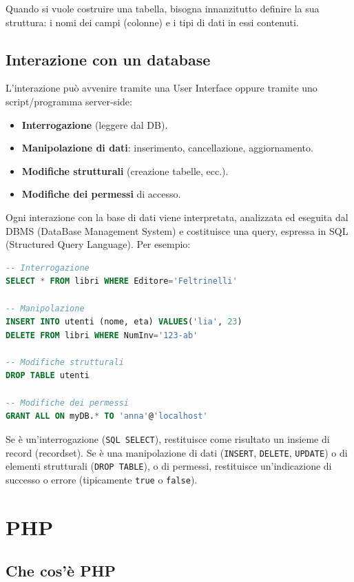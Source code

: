 Quando si vuole costruire una tabella, bisogna innanzitutto definire la sua struttura: i nomi dei campi (colonne) e i tipi di dati in essi contenuti.

\subsection{Interazione con un database}

L'interazione può avvenire tramite una User Interface oppure tramite uno script/programma server-side:

\begin{itemize}
    \item \textbf{Interrogazione} (leggere dal DB).
    \item \textbf{Manipolazione di dati}: inserimento, cancellazione, aggiornamento.
    \item \textbf{Modifiche strutturali} (creazione tabelle, ecc.).
    \item \textbf{Modifiche dei permessi} di accesso.
\end{itemize}

Ogni interazione con la base di dati viene interpretata, analizzata ed eseguita dal DBMS (DataBase Management System) e costituisce una query, espressa in SQL (Structured Query Language). Per esempio:

\begin{lstlisting}[language=SQL]
-- Interrogazione
SELECT * FROM libri WHERE Editore='Feltrinelli'

-- Manipolazione
INSERT INTO utenti (nome, eta) VALUES('lia', 23)
DELETE FROM libri WHERE NumInv='123-ab'

-- Modifiche strutturali
DROP TABLE utenti

-- Modifiche dei permessi
GRANT ALL ON myDB.* TO 'anna'@'localhost'
\end{lstlisting}

Se è un'interrogazione (\texttt{SQL SELECT}), restituisce come risultato un insieme di record (recordset). Se è una manipolazione di dati (\texttt{INSERT}, \texttt{DELETE}, \texttt{UPDATE}) o di elementi strutturali (\texttt{DROP TABLE}), o di permessi, restituisce un'indicazione di successo o errore (tipicamente \texttt{true} o \texttt{false}).

\section{PHP}

\subsection{Che cos'è PHP}

